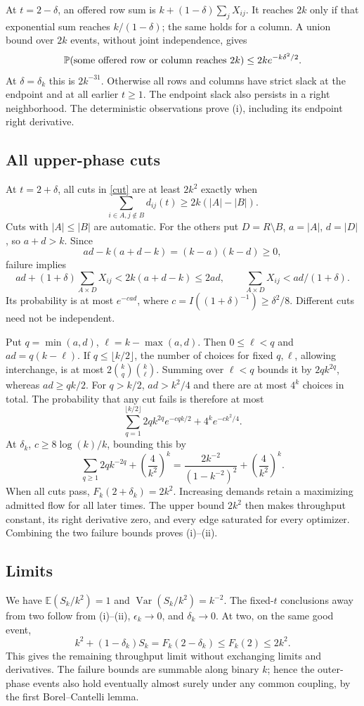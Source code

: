 \documentclass[10pt]{article}
\newcommand{\Pp}{\mathbb P}
\newcommand{\E}{\mathbb E}
\begin{document}
At \(t=2-\delta\), an offered row sum is
\(k+(1-\delta)\sum_jX_{ij}\). It reaches \(2k\) only if that exponential
sum reaches \(k/(1-\delta)\); the same holds for a column.
A union bound over \(2k\) events, without joint independence, gives
\[
 \Pp(\hbox{some offered row or column reaches }2k)
       \le2k e^{-k\delta^2/2}.
\]
At \(\delta=\delta_k\) this is \(2k^{-31}\). Otherwise all rows and columns
have strict slack at the endpoint and at all earlier \(t\ge1\).
The endpoint slack also persists in a right neighborhood. The deterministic
observations prove (i), including its endpoint right derivative.

\subsection{All upper-phase cuts}
At \(t=2+\delta\), all cuts in \eqref{cut} are at least \(2k^2\)
exactly when
\[
 \sum_{i\in A,j\notin B}d_{ij}(t)\ge2k(|A|-|B|).
\]
Cuts with \(|A|\le|B|\) are automatic. For the others put
\(D=R\setminus B\), \(a=|A|\), \(d=|D|\), so \(a+d>k\).
Since
\[
 ad-k(a+d-k)=(k-a)(k-d)\ge0,
\]
failure implies
\[
 ad+(1+\delta)\sum_{A\times D}X_{ij}<2k(a+d-k)\le2ad,
 \qquad \sum_{A\times D}X_{ij}<ad/(1+\delta).
\]
Its probability is at most \(e^{-cad}\), where
\(c=I((1+\delta)^{-1})\ge\delta^2/8\). Different cuts need not be independent.

Put \(q=\min(a,d)\), \(\ell=k-\max(a,d)\). Then \(0\le\ell<q\) and
\(ad=q(k-\ell)\). If \(q\le\lfloor k/2\rfloor\), the number of choices
for fixed \(q,\ell\), allowing interchange, is at most
\(2\binom{k}{q}\binom{k}{\ell}\). Summing over \(\ell<q\) bounds it by
\(2q k^{2q}\), whereas \(ad\ge qk/2\). For \(q>k/2\), \(ad>k^2/4\)
and there are at most \(4^k\) choices in total. The probability that any
cut fails is therefore at most
\[
 \sum_{q=1}^{\lfloor k/2\rfloor}2q k^{2q}e^{-cqk/2}
                     +4^k e^{-ck^2/4}.
\]
At \(\delta_k\), \(c\ge8\log(k)/k\), bounding this by
\[
 \sum_{q\ge1}2q k^{-2q}+\left(\frac4{k^2}\right)^k
   =\frac{2k^{-2}}{(1-k^{-2})^2}+\left(\frac4{k^2}\right)^k.
\]
When all cuts pass, \(F_k(2+\delta_k)=2k^2\). Increasing demands retain a
maximizing admitted flow for all later times. The upper bound \(2k^2\)
then makes throughput constant, its right derivative zero, and every
edge saturated for every optimizer. Combining the two failure bounds
proves (i)--(ii).

\subsection{Limits}
We have \(\E(S_k/k^2)=1\) and
\(\operatorname{Var}(S_k/k^2)=k^{-2}\).
The fixed-\(t\) conclusions away from two follow from (i)--(ii),
\(\epsilon_k\to0\), and \(\delta_k\to0\). At two, on the same good event,
\[
 k^2+(1-\delta_k)S_k=F_k(2-\delta_k)
                    \le F_k(2)\le2k^2.
\]
This gives the remaining throughput limit without exchanging limits and
derivatives. The failure bounds are summable along binary \(k\); hence the
outer-phase events also hold eventually almost surely under any common
coupling, by the first Borel--Cantelli lemma.
\end{document}
